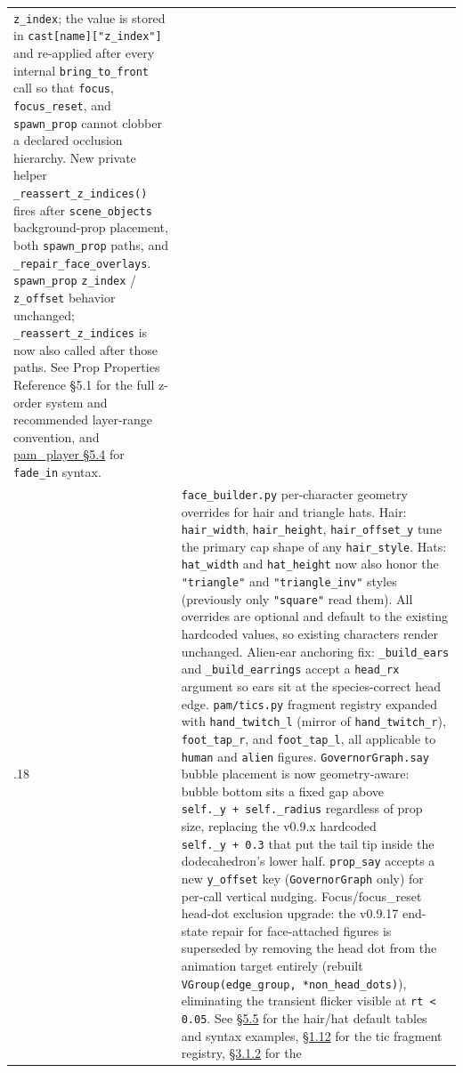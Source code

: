\documentclass[
  11pt,
]{book}
\begin{document}
\begin{longtable}[]{@{}
  >{\raggedright\arraybackslash}p{}
  >{\raggedright\arraybackslash}p{}@{}}
\texttt{z\_index}; the value is stored in \texttt{cast[name]["z\_index"]}
and re-applied after every internal \texttt{bring\_to\_front} call so
that \texttt{focus}, \texttt{focus\_reset}, and \texttt{spawn\_prop}
cannot clobber a declared occlusion hierarchy.
New private helper \texttt{\_reassert\_z\_indices()} fires after
\texttt{scene\_objects} background-prop placement, both
\texttt{spawn\_prop} paths, and \texttt{\_repair\_face\_overlays}.
\texttt{spawn\_prop} \texttt{z\_index} / \texttt{z\_offset} behavior
unchanged; \texttt{\_reassert\_z\_indices} is now also called after those
paths. See Prop Properties Reference §5.1 for the full z-order system
and recommended layer-range convention, and
\hyperref[fade-in-z-index]{pam\_player §5.4} for
\texttt{fade\_in} syntax. \\
0.9.18 & \texttt{face\_builder.py} per-character geometry overrides for
hair and triangle hats. Hair: \texttt{hair\_width}, \texttt{hair\_height},
\texttt{hair\_offset\_y} tune the primary cap shape of any
\texttt{hair\_style}. Hats: \texttt{hat\_width} and \texttt{hat\_height}
now also honor the \texttt{"triangle"} and \texttt{"triangle\_inv"}
styles (previously only \texttt{"square"} read them). All overrides are
optional and default to the existing hardcoded values, so existing
characters render unchanged. Alien-ear anchoring fix: \texttt{\_build\_ears}
and \texttt{\_build\_earrings} accept a \texttt{head\_rx} argument so
ears sit at the species-correct head edge. \texttt{pam/tics.py}
fragment registry expanded with \texttt{hand\_twitch\_l} (mirror of
\texttt{hand\_twitch\_r}), \texttt{foot\_tap\_r}, and
\texttt{foot\_tap\_l}, all applicable to \texttt{human} and
\texttt{alien} figures.
\texttt{GovernorGraph.say} bubble placement is now geometry-aware:
bubble bottom sits a fixed gap above
\texttt{self.\_y\ +\ self.\_radius} regardless of prop size, replacing
the v0.9.x hardcoded \texttt{self.\_y\ +\ 0.3} that put the tail tip
inside the dodecahedron's lower half. \texttt{prop\_say} accepts a new
\texttt{y\_offset} key (\texttt{GovernorGraph} only) for per-call
vertical nudging.
Focus/focus\_reset head-dot exclusion upgrade: the v0.9.17 end-state
repair for face-attached figures is superseded by removing the head
dot from the animation target entirely (rebuilt
\texttt{VGroup(edge\_group,\ *non\_head\_dots)}), eliminating the
transient flicker visible at \texttt{rt < 0.05}.
See \hyperref[hat-geometry-reference]{§5.5} for the hair/hat default
tables and syntax examples, \hyperref[tic_profile]{§1.12} for the
tic fragment registry, \hyperref[prop_say]{§3.1.2} for the

\end{longtable}
\end{document}
